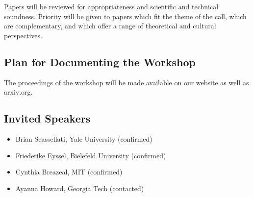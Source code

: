 \documentclass{sig-alternate-05-2015}
\begin{document}
Papers will be reviewed for appropriateness and scientific and technical soundness. Priority will be given to papers which fit the theme of the call, which are complementary, and which offer a range of theoretical and cultural perspectives.

\subsection*{Plan for Documenting the Workshop}
The proceedings of the workshop will be made available on our website as well as arxiv.org.


\subsection*{Invited Speakers}
\begin{itemize} [label={}]
	
	\item Brian Scassellati, Yale University (confirmed)
	\item Friederike Eyssel, Bielefeld University (confirmed)
	\item Cynthia Breazeal, MIT (confirmed)
	\item Ayanna Howard, Georgia Tech (contacted)
\end{itemize}
\end{document}
